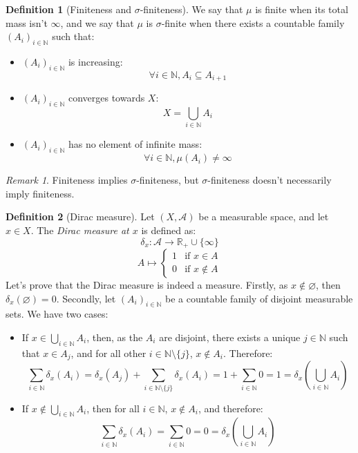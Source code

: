 \documentclass{article}
\theoremstyle{definition}
\newtheorem{definition}{Definition}[section]
\theoremstyle{remark}
\newtheorem*{remark}{Remark}
\theoremstyle{example}
\newcommand{\tif}{\text{if }}
\begin{document}
\begin{definition}[Finiteness and $\sigma$-finiteness]
    We say that $\mu$ is finite when its total mass isn't $\infty$, and we say that $\mu$ is $\sigma$-finite when there exists a countable family $(A_i)_{i \in \mathbb{N}}$ such that:
    \begin{itemize}
        \item $(A_i)_{i \in \mathbb{N}}$ is increasing:
            $$\forall i \in \mathbb{N}, A_i \subseteq A_{i+1}$$
        \item $(A_i)_{i \in \mathbb{N}}$ converges towards $X$:
            $$X = \bigcup_{i \in \mathbb{N}} A_i$$
        \item $(A_i)_{i \in \mathbb{N}}$ has no element of infinite mass:
            $$\forall i \in \mathbb{N}, \mu(A_i) \neq \infty$$
    \end{itemize}
\end{definition}

\begin{remark}
    Finiteness implies $\sigma$-finiteness, but $\sigma$-finiteness doesn't necessarily imply finiteness.
\end{remark}

\begin{definition}[Dirac measure]
    Let $(X, \mathcal{A})$ be a measurable space, and let $x \in X$. The \textit{Dirac measure at $x$} is defined as:
        $$\delta_x : \mathcal{A} \rightarrow \mathbb{R}_+ \cup \{\infty\}$$
        $$A \mapsto \begin{cases} 1 & \tif x \in A\\ 0 & \tif x \notin A\end{cases}$$
    Let's prove that the Dirac measure is indeed a measure. Firstly, as $x \notin \varnothing$, then $\delta_x(\varnothing) = 0$. Secondly, let $(A_i)_{i \in \mathbb{N}}$ be a countable family of disjoint measurable sets. We have two cases:
    \begin{itemize}
        \item If $x \in \bigcup_{i \in \mathbb{N}} A_i$, then, as the $A_i$ are disjoint, there exists a unique $j \in \mathbb{N}$ such that $x \in A_j$, and for all other $i \in \mathbb{N} \setminus \{j\}$, $x \notin A_i$. Therefore:
            $$\sum_{i \in \mathbb{N}} \delta_x(A_i) = \delta_x(A_j) + \sum_{i \in \mathbb{N} \setminus \{j\}} \delta_x(A_i) = 1 + \sum_{i \in \mathbb{N}} 0 = 1 = \delta_x(\bigcup_{i \in \mathbb{N}} A_i)$$
        \item If $x \notin \bigcup_{i \in \mathbb{N}} A_i$, then for all $i \in \mathbb{N}$, $x \notin A_i$, and therefore:
        $$\sum_{i \in \mathbb{N}} \delta_x(A_i) = \sum_{i \in \mathbb{N}} 0 = 0 = \delta_x(\bigcup_{i \in \mathbb{N}} A_i)$$
    \end{itemize}
\end{definition}
\end{document}
